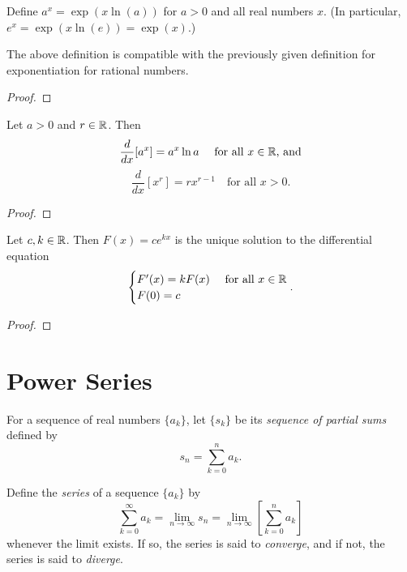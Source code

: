 \documentclass[letterpaper, twoside, 12pt]{book}
\begin{document}
\begin{definition}
  Define \(a^x=\exp(x\ln(a))\) for \(a>0\) and all real numbers \(x\).
  (In particular, \(e^x=\exp(x\ln(e))=\exp(x)\).)
\end{definition}

\begin{proposition}[pg. 121]
  The above definition is compatible with the previously given definition
  for exponentiation for rational numbers.
\end{proposition}
\begin{proof}

\end{proof}

\begin{proposition}[5.2, 5.3]
  Let \(a>0\) and \(r\in\mathbb R\). Then
  \[
    \frac{d}{dx}[a^x]=a^x\ln a
    ~~~\text{ for all } x\in\mathbb R \text{, and}
  \]
  \[
    \frac{d}{dx}[x^r]=rx^{r-1}
    ~~~\text{ for all } x>0
  .\]
\end{proposition}
\begin{proof}

\end{proof}

\begin{theorem}[5.4]
  Let \(c,k\in\mathbb R\). Then \(F(x)=ce^{kx}\) is the unique solution
  to the differential equation
  \[
    \begin{cases}
      F'(x)=kF(x) & \text{ for all } x\in \mathbb R \\
      F(0)=c
    \end{cases}
  .\]
\end{theorem}
\begin{proof}

\end{proof}

\section{Power Series}

\begin{definition}
  For a sequence of real numbers \(\{a_k\}\), let \(\{s_k\}\) be its
  \textit{sequence of partial sums} defined by
  \[
    s_n = \sum_{k=0}^{n} a_k
  .\]
\end{definition}

\begin{definition}
  Define the \textit{series} of a sequence \(\{a_k\}\) by
  \[
    \sum_{k=0}^\infty a_k
      =
    \lim_{n\to\infty} s_n
      =
    \lim_{n\to\infty}\left[\sum_{k=0}^{n} a_k\right]
  \]
  whenever the limit exists. If so, the series is said to \textit{converge},
  and if not, the series is said to \textit{diverge}.
\end{definition}
\end{document}
